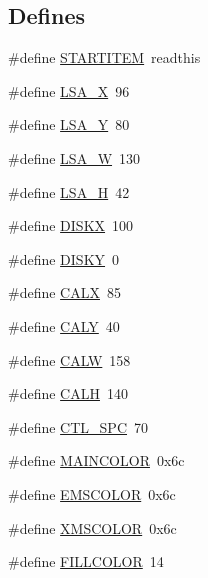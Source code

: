 \subsection*{Defines}
\begin{DoxyCompactItemize}
\item 
\#define \hyperlink{WL__MENU_8C_ae5a930567b6b21af5badc288074bfd21}{STARTITEM}~readthis
\item 
\#define \hyperlink{WL__MENU_8C_af952506ca8f9e574c15dcb3ac1c0ee60}{LSA\_\-X}~96
\item 
\#define \hyperlink{WL__MENU_8C_a3ace43281d3722ed5ebbfbf58506ff1e}{LSA\_\-Y}~80
\item 
\#define \hyperlink{WL__MENU_8C_a5802262c3ef20500a4cf1eef66ae2cd8}{LSA\_\-W}~130
\item 
\#define \hyperlink{WL__MENU_8C_a425be512d9031f756556c3b48e91e1e9}{LSA\_\-H}~42
\item 
\#define \hyperlink{WL__MENU_8C_adc41a8014e75e6a58fd7a80baf966ea9}{DISKX}~100
\item 
\#define \hyperlink{WL__MENU_8C_a49506cc0ef566abf7870814680ba5bab}{DISKY}~0
\item 
\#define \hyperlink{WL__MENU_8C_aac3806357bc5624168e71360e86e85dd}{CALX}~85
\item 
\#define \hyperlink{WL__MENU_8C_a8660b9c69109a6b308e1cf644b7cd4e2}{CALY}~40
\item 
\#define \hyperlink{WL__MENU_8C_a4ae60b3db9a147f11f115f1d3191b5f2}{CALW}~158
\item 
\#define \hyperlink{WL__MENU_8C_af0a873674736559b8c3ffd9b2a5f03a6}{CALH}~140
\item 
\#define \hyperlink{WL__MENU_8C_a3f0b9b62d1ec031b0da57a392e765c39}{CTL\_\-SPC}~70
\item 
\#define \hyperlink{WL__MENU_8C_ad7f56449422ad8e56c6a2d03e9973cf6}{MAINCOLOR}~0x6c
\item 
\#define \hyperlink{WL__MENU_8C_a6bae393eefa4118969c76b8ec0914268}{EMSCOLOR}~0x6c
\item 
\#define \hyperlink{WL__MENU_8C_ac665ef8c4bb9d5a40af5329437a5223e}{XMSCOLOR}~0x6c
\item 
\#define \hyperlink{WL__MENU_8C_a7deece511a2503ec4a933132fde6dadb}{FILLCOLOR}~14
\end{DoxyCompactItemize}
